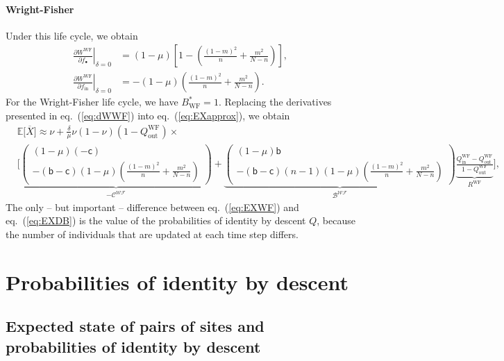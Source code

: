\documentclass[11pt, letterpaper]{article}
\renewcommand{\eqref}[1]{\textup{{\normalfont eq.~(\ref{#1}}\normalfont)}}
\newcommand{\deriv}[2]{\partial_{#2}\!{#1}\,}
\newcommand{\derivv}[3]{\left.\frac{\partial #1}{\partial #2}\right |_{#3=0}} %
\newcommand{\Esp}[1]{\mathbb{E}\big[ #1\big]}%
\newcommand{\bb}{\mathsf{b}}
\newcommand{\cc}{\mathsf{c}}
\newcommand{\WF}{\textrm{WF}}
\newcommand{\mutbias}{\nu}
\newcommand{\inn}{\textrm{in}}
\newcommand{\out}{\textrm{out}}
\newcommand{\focal}{\bullet}
\newcommand{\selstr}{\delta}
\begin{document}
\paragraph{Wright-Fisher}
Under this life cycle, we obtain
\begin{subequations}\label{eq:dWWF}
\begin{align}
\derivv{W^{\WF}}{f_{\focal}}{\selstr} &= (1-\mu) \left[ 1 - \left( \frac{(1-m)^2}{n} + \frac{m^2}{N-n}  \right) \right],\\
\derivv{W^{\WF}}{f_{\inn}}{\selstr} &= - (1-\mu) \left( \frac{(1-m)^2}{n} + \frac{m^2}{N-n}  \right). 
\end{align}
\end{subequations}
For the Wright-Fisher life cycle, we have $B^*_{\WF} = 1$.
%
Replacing the derivatives presented in \eqref{eq:dWWF} into \eqref{eq:EXapprox}, we obtain
%
\begin{equation}\label{eq:EXWF}
\begin{split}
& \Esp{\overline{X}}  \approx \mutbias + 
\frac{\selstr}{\mu}  \mutbias (1-\mutbias) (1 - Q_{\out}^{\WF}) \times \\
 &\Bigg[ \underbrace{ \begin{pmatrix}
 (1-\mu) (-\cc) \\
- (\bb - \cc) (1-\mu) \left( \frac{(1-m)^2}{n} + \frac{m^2}{N-n}\right) 
 \end{pmatrix}
}_{-\mathcal{C^{\WF}}} + \underbrace{ \begin{pmatrix}
(1-\mu) \bb \\
- (\bb - \cc) (n-1)(1-\mu) \left( \frac{(1-m)^2}{n} + \frac{m^2}{N-n} \right) 
\end{pmatrix}
}_{\mathcal{B^{\WF}}} \underbrace{\frac{Q_{\inn}^{\WF} - Q_{\out}^{\WF}}{1 - Q_{\out}^{\WF}}}_{R^{\WF}} \Bigg],
\end{split}
\end{equation}
%
The only -- but important -- difference between \eqref{eq:EXWF} and \eqref{eq:EXDB} is the value of the probabilities of identity by descent $Q$, because the number of individuals that are updated at each time step differs. 

\clearpage

\section{Probabilities of identity by descent}
\subsection{Expected state of pairs of sites and probabilities of identity by descent\label{sec:app:IBD}}
\end{document}
